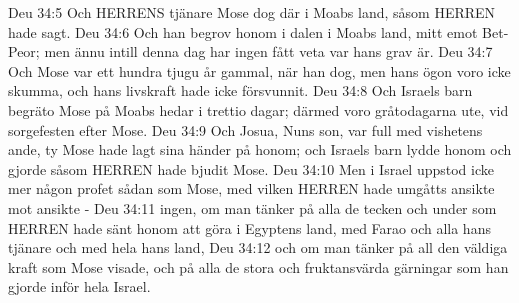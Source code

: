 Deu 34:5  Och HERRENS tjänare Mose dog där i Moabs land, såsom HERREN hade sagt.
Deu 34:6  Och han begrov honom i dalen i Moabs land, mitt emot Bet-Peor; men ännu intill denna dag har ingen fått veta var hans grav är.
Deu 34:7  Och Mose var ett hundra tjugu år gammal, när han dog, men hans ögon voro icke skumma, och hans livskraft hade icke försvunnit.
Deu 34:8  Och Israels barn begräto Mose på Moabs hedar i trettio dagar; därmed voro gråtodagarna ute, vid sorgefesten efter Mose.
Deu 34:9  Och Josua, Nuns son, var full med vishetens ande, ty Mose hade lagt sina händer på honom; och Israels barn lydde honom och gjorde såsom HERREN hade bjudit Mose.
Deu 34:10  Men i Israel uppstod icke mer någon profet sådan som Mose, med vilken HERREN hade umgåtts ansikte mot ansikte -
Deu 34:11  ingen, om man tänker på alla de tecken och under som HERREN hade sänt honom att göra i Egyptens land, med Farao och alla hans tjänare och med hela hans land,
Deu 34:12  och om man tänker på all den väldiga kraft som Mose visade, och på alla de stora och fruktansvärda gärningar som han gjorde inför hela Israel.


